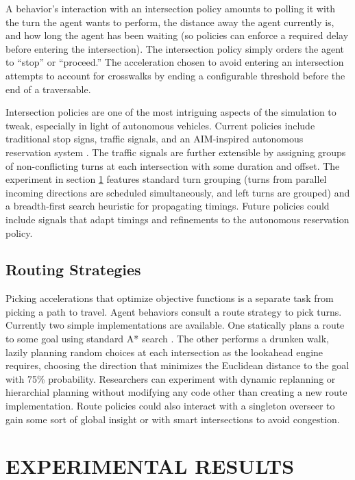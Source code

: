 \documentclass[letterpaper, 10 pt, conference]{ieeeconf}  %
\begin{document}
A behavior's interaction with an intersection policy amounts to polling it with
the turn the agent wants to perform, the distance away the agent currently is,
and how long the agent has been waiting (so policies can enforce a required
delay before entering the intersection). The intersection policy simply orders
the agent to ``stop'' or ``proceed.'' The acceleration chosen to avoid entering
an intersection attempts to account for crosswalks by ending a configurable
threshold before the end of a traversable.

Intersection policies are one of the most intriguing aspects of the simulation
to tweak, especially in light of autonomous vehicles. Current policies include
traditional stop signs, traffic signals, and an AIM-inspired autonomous
reservation system \cite{JAIR08-dresner}. The traffic signals are further
extensible by assigning groups of non-conflicting turns at each intersection
with some duration and offset. The experiment in section \ref{sec:results}
features standard turn grouping (turns from parallel incoming directions are
scheduled simultaneously, and left turns are grouped) and a breadth-first search
heuristic for propagating timings. Future policies could include signals that
adapt timings and refinements to the autonomous reservation policy.

\subsection{Routing Strategies}

Picking accelerations that optimize objective functions is a separate task from
picking a path to travel. Agent behaviors consult a route strategy to pick
turns. Currently two simple implementations are available. One statically plans
a route to some goal using standard A* search \cite{astar}. The other performs a
drunken walk, lazily planning random choices at each intersection as the
lookahead engine requires, choosing the direction that minimizes the Euclidean
distance to the goal with 75\% probability. Researchers can experiment with
dynamic replanning or hierarchial planning without modifying any code other than
creating a new route implementation. Route policies could also interact with a
singleton overseer to gain some sort of global insight or with smart
intersections to avoid congestion.


\section{EXPERIMENTAL RESULTS}
\label{sec:results}
\end{document}
